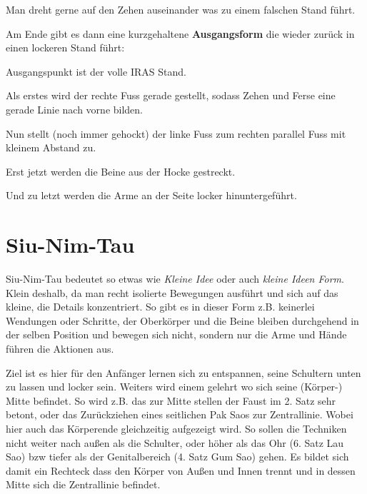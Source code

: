\begin{WTCommonNoob}
	Man dreht gerne auf den Zehen auseinander was zu einem falschen Stand f\"uhrt.
\end{WTCommonNoob}



Am Ende gibt es dann eine kurzgehaltene \textbf{Ausgangsform} die wieder zur\"uck in einen lockeren Stand f\"uhrt:

\begin{WTalphenum}
	\item Ausgangspunkt ist der volle IRAS Stand.
	\item Als erstes wird der rechte Fuss gerade gestellt, sodass Zehen und Ferse eine gerade Linie nach vorne bilden.
	\item Nun stellt (noch immer gehockt) der linke Fuss zum rechten parallel Fuss mit kleinem Abstand zu.
	\item Erst jetzt werden die Beine aus der Hocke gestreckt.
	\item Und zu letzt werden die Arme an der Seite locker hinuntergef\"uhrt.
\end{WTalphenum}


\section{Siu-Nim-Tau}

Siu-Nim-Tau bedeutet so etwas wie \textit{Kleine Idee} oder auch \textit{kleine Ideen Form}. Klein deshalb, da man recht isolierte Bewegungen ausf\"uhrt und sich auf das kleine, die Details konzentriert. So gibt es in dieser Form z.B. keinerlei Wendungen oder Schritte, der Oberk\"orper und die Beine bleiben durchgehend in der selben Position und bewegen sich nicht, sondern nur die Arme und H\"ande f\"uhren die Aktionen aus.

Ziel ist es hier f\"ur den Anf\"anger lernen sich zu entspannen, seine Schultern unten zu lassen und locker sein. Weiters wird einem gelehrt wo sich seine (K\"orper-) Mitte befindet. So wird z.B. das zur Mitte stellen der Faust im 2. Satz sehr betont, oder das Zur\"uckziehen eines seitlichen Pak Saos zur Zentrallinie. Wobei hier auch das K\"orperende gleichzeitig aufgezeigt wird. So sollen die Techniken nicht weiter nach au{\ss}en als die Schulter, oder h\"oher als das Ohr (6. Satz Lau Sao) bzw tiefer als der Genitalbereich (4. Satz Gum Sao) gehen. Es bildet sich damit ein Rechteck dass den K\"orper von Au{\ss}en und Innen trennt und in dessen Mitte sich die Zentrallinie befindet.

